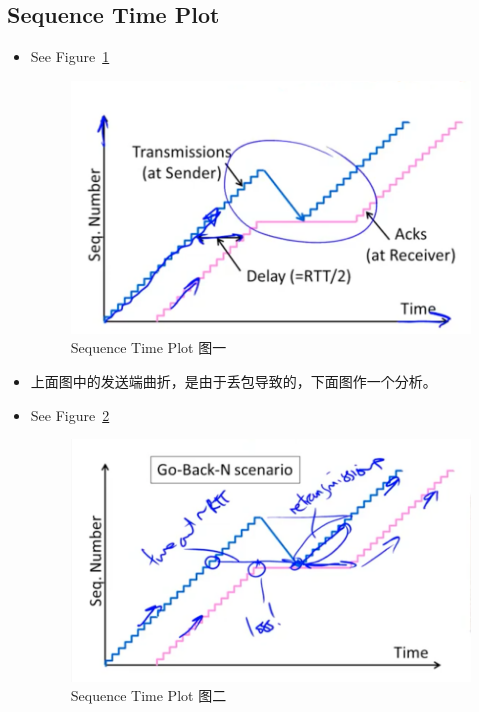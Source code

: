 \documentclass[12pt]{ctexart}   %
\begin{document}
	\subsection{Sequence Time Plot}
	\begin{itemize}
		\item See Figure~\ref{fig:6-5-7}
		  
		 \begin{figure}[h!] %
		\centering
		 \includegraphics[scale=0.7]{images/6-5-7}
		\caption{  Sequence Time Plot 图一}
		 \label{fig:6-5-7}
		 \end{figure}
		 
		 \item 上面图中的发送端曲折，是由于丢包导致的，下面图作一个分析。
		 \item See Figure~\ref{fig:6-5-8}
		  
		 \begin{figure}[h!] %
		\centering
		 \includegraphics[scale=0.7]{images/6-5-8}
		\caption{  Sequence Time Plot 图二}
		 \label{fig:6-5-8}
		 \end{figure}
	\end{itemize}
	
\end{document}
